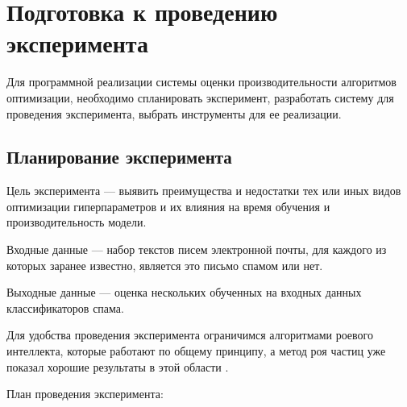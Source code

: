 \section{Подготовка к проведению эксперимента}

Для программной реализации системы оценки производительности
алгоритмов оптимизации, необходимо спланировать эксперимент,
разработать систему для проведения эксперимента, выбрать инструменты для ее реализации.

\subsection{Планирование эксперимента}

Цель эксперимента — выявить преимущества и недостатки тех или иных видов
оптимизации гиперпараметров и их влияния на время обучения и производительность
модели.

Входные данные — набор текстов писем электронной почты, для каждого из которых
заранее известно, является это письмо спамом или нет.

Выходные данные — оценка нескольких обученных на входных данных классификаторов спама.

Для удобства проведения эксперимента ограничимся алгоритмами роевого интеллекта,
которые работают по общему принципу, а метод роя частиц уже показал хорошие
результаты в этой области \cite{IEEE}.

План проведения эксперимента:

